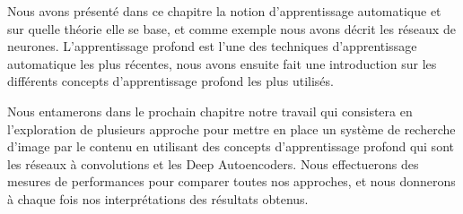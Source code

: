 	Nous avons présenté dans ce chapitre la notion d'apprentissage automatique et sur quelle théorie elle se base, et comme exemple nous avons décrit les réseaux de neurones. L'apprentissage profond est l'une des techniques d'apprentissage automatique les plus récentes, nous avons ensuite fait une introduction sur les différents concepts d'apprentissage profond les plus utilisés.
	
	Nous entamerons dans le prochain chapitre notre travail qui consistera en l'exploration de plusieurs approche pour mettre en place un système de recherche d'image par le contenu en utilisant des concepts d'apprentissage profond qui sont les réseaux à convolutions et les Deep Autoencoders. Nous effectuerons des mesures de performances pour comparer toutes nos approches, et nous donnerons à chaque fois nos interprétations des résultats obtenus.

